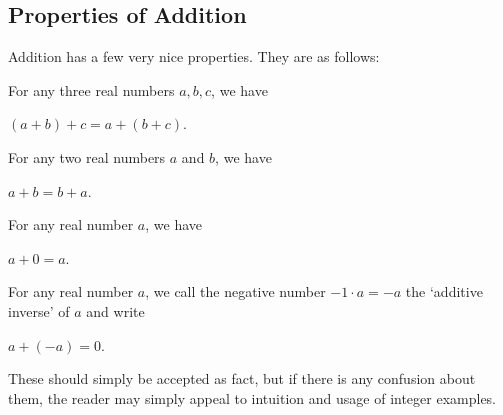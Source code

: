 \documentclass[openany]{book}
\begin{document}
\subsection{Properties of Addition}
Addition has a few very nice properties. They are as follows:
\begin{property}
	For any three real numbers $a,b,c$, we have
	\begin{center}
		$(a+b)+c = a+(b+c)$.
	\end{center}
\end{property}
\begin{property}
	For any two real numbers $a$ and $b$, we have
	\begin{center}
		$a+b = b+a$.
	\end{center}
\end{property}
\begin{property}
	For any real number $a$, we have
	\begin{center}
		$a+0=a$.
	\end{center}
\end{property}
\begin{property}
	For any real number $a$, we call the negative number $-1\cdot a = -a$ the `additive inverse' of $a$ and write
	\begin{center}
		$a+(-a)=0$.
	\end{center}
\end{property}
These should simply be accepted as fact, but if there is any confusion about them, the reader may simply appeal to intuition and usage of integer examples.
\end{document}
